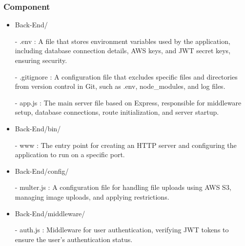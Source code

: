 \documentclass[conference]{IEEEtran}
\begin{document}
            \subsubsection{Component}
                \begin{itemize}
                    \item Back-End/
                        \item[-] .env : A file that stores environment variables used by the application, including database connection details, AWS keys, and JWT secret keys, ensuring security.
                        \item[-] .gitignore : A configuration file that excludes specific files and directories from version control in Git, such as .env, node\_modules, and log files.
                        \item[-] app.js : The main server file based on Express, responsible for middleware setup, database connections, route initialization, and server startup.
                    \vspace{3mm}
                    
                    \item Back-End/bin/
                        \item[-] www : The entry point for creating an HTTP server and configuring the application to run on a specific port.
                    \vspace{3mm}
                    
                    \item Back-End/config/
                        \item[-] multer.js : A configuration file for handling file uploads using AWS S3, managing image uploads, and applying restrictions.
                    \vspace{3mm}
                    
                    \item Back-End/middleware/
                        \item[-] auth.js : Middleware for user authentication, verifying JWT tokens to ensure the user's authentication status.
                    \vspace{3mm}
                    

\end{itemize}
\end{document}
